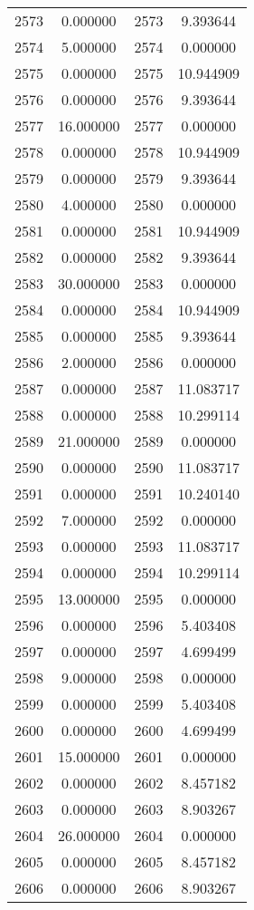 \documentclass[12pt]{article}
\begin{document}
\begin{longtable}{@{}cccc@{}}
2573 & 0.000000 & 2573 & 9.393644 \\
2574 & 5.000000 & 2574 & 0.000000 \\
2575 & 0.000000 & 2575 & 10.944909 \\
2576 & 0.000000 & 2576 & 9.393644 \\
2577 & 16.000000 & 2577 & 0.000000 \\
2578 & 0.000000 & 2578 & 10.944909 \\
2579 & 0.000000 & 2579 & 9.393644 \\
2580 & 4.000000 & 2580 & 0.000000 \\
2581 & 0.000000 & 2581 & 10.944909 \\
2582 & 0.000000 & 2582 & 9.393644 \\
2583 & 30.000000 & 2583 & 0.000000 \\
2584 & 0.000000 & 2584 & 10.944909 \\
2585 & 0.000000 & 2585 & 9.393644 \\
2586 & 2.000000 & 2586 & 0.000000 \\
2587 & 0.000000 & 2587 & 11.083717 \\
2588 & 0.000000 & 2588 & 10.299114 \\
2589 & 21.000000 & 2589 & 0.000000 \\
2590 & 0.000000 & 2590 & 11.083717 \\
2591 & 0.000000 & 2591 & 10.240140 \\
2592 & 7.000000 & 2592 & 0.000000 \\
2593 & 0.000000 & 2593 & 11.083717 \\
2594 & 0.000000 & 2594 & 10.299114 \\
2595 & 13.000000 & 2595 & 0.000000 \\
2596 & 0.000000 & 2596 & 5.403408 \\
2597 & 0.000000 & 2597 & 4.699499 \\
2598 & 9.000000 & 2598 & 0.000000 \\
2599 & 0.000000 & 2599 & 5.403408 \\
2600 & 0.000000 & 2600 & 4.699499 \\
2601 & 15.000000 & 2601 & 0.000000 \\
2602 & 0.000000 & 2602 & 8.457182 \\
2603 & 0.000000 & 2603 & 8.903267 \\
2604 & 26.000000 & 2604 & 0.000000 \\
2605 & 0.000000 & 2605 & 8.457182 \\
2606 & 0.000000 & 2606 & 8.903267 \\

\end{longtable}
\end{document}
